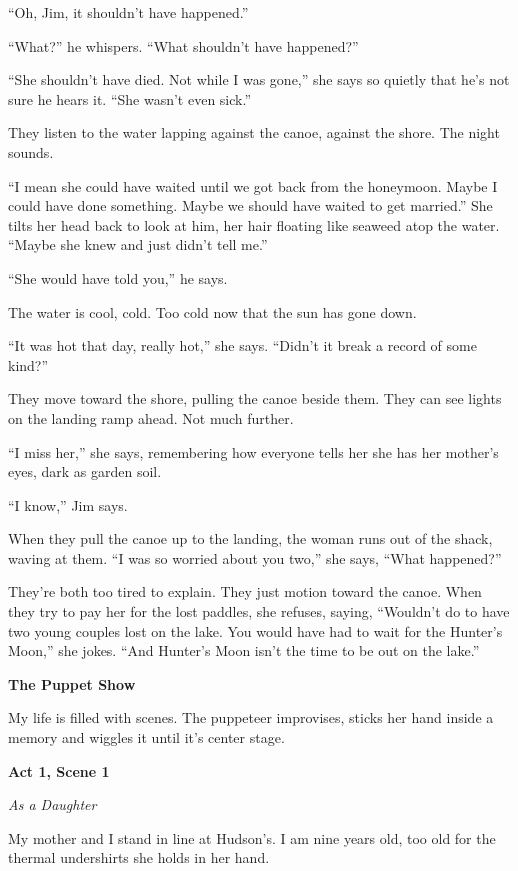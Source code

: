 \documentclass[
]{article}
\begin{document}
``Oh, Jim, it shouldn't have happened.''

``What?'' he whispers. ``What shouldn't have happened?''

``She shouldn't have died. Not while I was gone,'' she says so quietly
that he's not sure he hears it. ``She wasn't even sick.''

They listen to the water lapping against the canoe, against the shore.
The night sounds.

``I mean she could have waited until we got back from the honeymoon.
Maybe I could have done something. Maybe we should have waited to get
married.'' She tilts her head back to look at him, her hair floating
like seaweed atop the water. ``Maybe she knew and just didn't tell me.''

``She would have told you,'' he says.

The water is cool, cold. Too cold now that the sun has gone down.

``It was hot that day, really hot,'' she says. ``Didn't it break a
record of some kind?''

They move toward the shore, pulling the canoe beside them. They can see
lights on the land­ing ramp ahead. Not much further.

``I miss her,'' she says, remembering how everyone tells her she has her
mother's eyes, dark as garden soil.

``I know,'' Jim says.

When they pull the canoe up to the landing, the woman runs out of the
shack, waving at them. ``I was so worried about you two,'' she says,
``What happened?''

They're both too tired to explain. They just motion toward the canoe.
When they try to pay her for the lost paddles, she refuses, saying,
``Wouldn't do to have two young couples lost on the lake. You would have
had to wait for the Hunter's Moon,'' she jokes. ``And Hunter's Moon
isn't the time to be out on the lake.''

\textbf{\hfill\break
}

\textbf{The Puppet Show}

My life is filled with scenes. The puppeteer improvises, sticks her hand
inside a memory and wiggles it until it's center stage.

\textbf{Act 1, Scene 1}

\emph{As a Daughter}

My mother and I stand in line at Hudson's. I am nine years old, too old
for the thermal under­shirts she holds in her hand.
\end{document}
